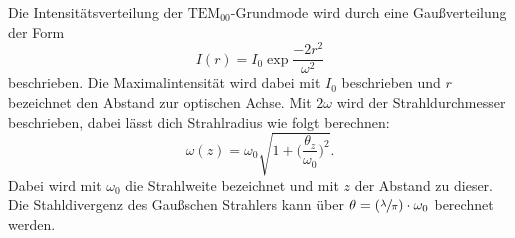 Die Intensitätsverteilung der $\text{TEM}_{00}$-Grundmode wird durch eine Gaußverteilung der Form
\begin{equation}
  I(r)=I_0\exp{\frac{-2r^2}{\omega^2}}
\end{equation}
beschrieben. Die Maximalintensität wird dabei mit $I_0$ beschrieben und $r$ bezeichnet den Abstand
zur optischen Achse. Mit $2\omega$ wird der Strahldurchmesser beschrieben, dabei lässt dich Strahlradius
wie folgt berechnen:
\begin{equation}
  \omega(z)=\omega_0\sqrt{1+\Big(\frac{\theta_z}{\omega_0}\Big)^2}.
  \label{eqn:Strahlradius}
\end{equation}
Dabei wird mit $\omega_0$ die Strahlweite bezeichnet und mit $z$ der Abstand zu dieser.
Die Stahldivergenz des Gaußschen Strahlers kann über $\theta=(\sfrac{\lambda}{\pi})\cdot\omega_0$ berechnet werden.
